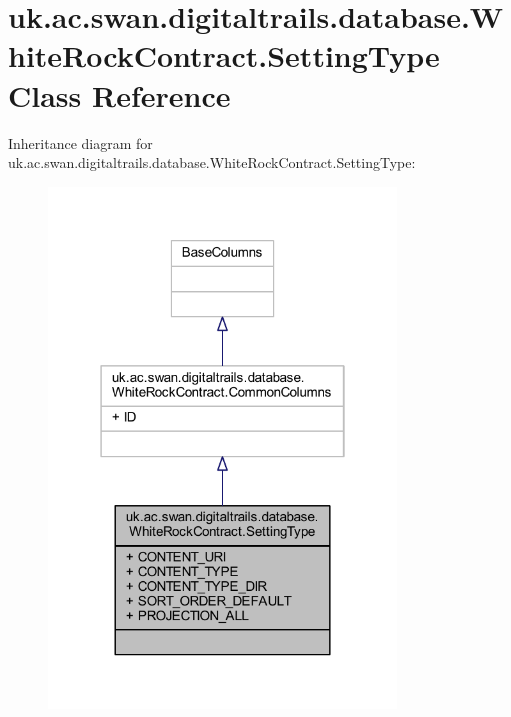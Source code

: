 \hypertarget{classuk_1_1ac_1_1swan_1_1digitaltrails_1_1database_1_1_white_rock_contract_1_1_setting_type}{\section{uk.\+ac.\+swan.\+digitaltrails.\+database.\+White\+Rock\+Contract.\+Setting\+Type Class Reference}
\label{classuk_1_1ac_1_1swan_1_1digitaltrails_1_1database_1_1_white_rock_contract_1_1_setting_type}
}


Inheritance diagram for uk.\+ac.\+swan.\+digitaltrails.\+database.\+White\+Rock\+Contract.\+Setting\+Type\+:
\nopagebreak
\begin{figure}[H]
\begin{center}
\leavevmode
\includegraphics[width=262pt]{classuk_1_1ac_1_1swan_1_1digitaltrails_1_1database_1_1_white_rock_contract_1_1_setting_type__inherit__graph}
\end{center}
\end{figure}



